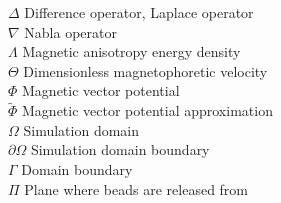 \begin{tabbing}
 $\Delta$ \> Difference operator, Laplace operator \> [$-$] \\[0.5ex]
 $\nabla$ \> Nabla operator \> [$-$] \\[0.5ex]
 $\Lambda$ \> Magnetic anisotropy energy density \> [J/m$^{3}$] \\[0.5ex] 
 $\Theta$ \> Dimensionless magnetophoretic velocity \> [$-$] \\[0.5ex] 
 $\Phi$ \> Magnetic vector potential \> [V$\cdot$s/m] \\[0.5ex]
 $\tilde{\Phi}$ \> Magnetic vector potential approximation \> [V$\cdot$s/m] \\[0.5ex]
 $\Omega$ \> Simulation domain \> [$-$] \\[0.5ex]
 $\partial\Omega$ \> Simulation domain boundary \> [$-$] \\[0.5ex]
 $\Gamma$ \> Domain boundary \> [$-$] \\[0.5ex]
 $\Pi$ \> Plane where beads are released from \> [$-$] \\[0.5ex]
\end{tabbing}

